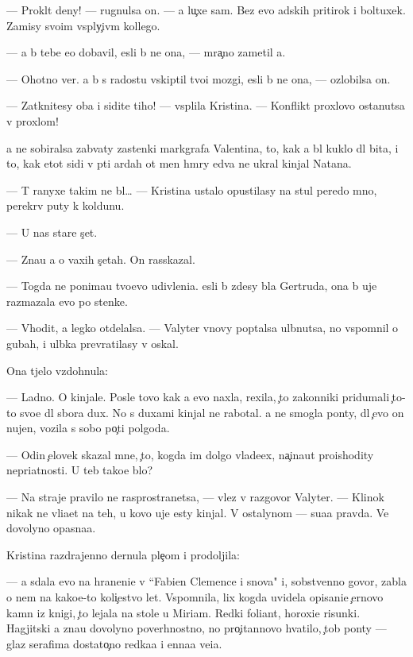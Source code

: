 \documentclass[10pt]{book}
\begin{document}
— Prokl{\ia}t{\yi}{\y} deny! — rugnulsa on. — {\Y}a lu{\c}xe sam. Bez {\y}evo adskih pritirok i boltuxek. Za{\y}misy svo{\y}im vsp{\yi}ly{\c}iv{\yi}m kollego{\y}.

— {\Y}a b{\yi} tebe {\y}e{\x}o dobavil, {\y}esli b{\yi} ne ona, — mra{\c}no zametil {\y}a.

— Ohotno ver{\iu}. {\Y}a b{\yi} s radost{\y}u vskip{\ia}til tvo{\y}i mozgi, {\y}esli b{\yi} ne ona, — ozlobilsa on.

— Zatknitesy oba i sidite tiho! — vsp{\yi}lila Kristina. — Konflikt{\yi} proxlovo ostanutsa v proxlom!

{\Y}a ne sobiralsa zab{\yi}vaty zastenki markgrafa Valentina, to, kak {\y}a b{\yi}l kuklo{\y} dl{\ia} bit{\y}a, i to, kak etot sid{\ia}{\x}i{\y} v p{\ia}ti {\y}ardah ot men{\ia} hm{\yi}ry {\y}edva ne ukral kinjal Natana.

— T{\yi} ranyxe takim ne b{\yi}l… — Kristina ustalo opustilasy na stul peredo mno{\y}, perekr{\yi}v puty k koldunu.

— U nas star{\yi}{\y}e s{\c}et{\yi}.

— Zna{\y}u {\y}a o vaxih s{\c}etah. On rasskazal.

— Togda ne ponima{\y}u tvo{\y}evo udivleni{\y}a. {\Y}esli b{\yi} zdesy b{\yi}la Gertruda, ona b{\yi} uje razmazala {\y}evo po stenke.

— V{\yi}hodit, {\y}a legko otdelalsa. — Valyter vnovy pop{\yi}talsa ul{\yi}bnutsa, no vspomnil o gubah, i ul{\yi}bka prevratilasy v oskal.

Ona t{\ia}jelo vzdohnula:

— Ladno. O kinjale. Posle tovo kak {\y}a {\y}evo naxla, rexila, {\c}to zakonniki pridumali {\c}to-to svo{\y}e dl{\ia} sbora dux. No s duxami kinjal ne rabotal. {\Y}a ne smogla pon{\ia}ty, dl{\ia} {\c}evo on nujen, vozila s sobo{\y} po{\c}ti polgoda.

— Odin {\c}elovek skazal mne, {\c}to, kogda im dolgo vlade{\y}ex, na{\c}ina{\y}ut proishodity nepri{\y}atnosti. U teb{\ia} tako{\y}e b{\yi}lo?

— Na straje{\y} pravilo ne rasprostran{\ia}{\y}etsa, — vlez v razgovor Valyter. — Klinok nikak ne vli{\y}a{\y}et na teh, u kovo uje {\y}esty kinjal{\yi}. V ostalynom — su{\x}a{\y}a pravda. Ve{\x} dovolyno opasna{\y}a.

Kristina razdrajenno dernula ple{\c}om i prodoljila:

— {\Y}a sdala {\y}evo na hraneni{\y}e v ``Fabien Clemence i s{\yi}nov{\y}a" i, sobstvenno govor{\ia}, zab{\yi}la o nem na kako{\y}e-to koli{\c}estvo let. Vspomnila, lix kogda uvidela opisani{\y}e {\c}ernovo kamn{\ia} iz knigi, {\c}to lejala na stole u Miriam. Redki{\y} foliant, horoxi{\y}e risunki. Hagjitski{\y} {\y}a zna{\y}u dovolyno poverhnostno, no pro{\c}itannovo hvatilo, {\c}tob{\yi} pon{\ia}ty — glaz serafima dostato{\c}no redka{\y}a i {\q}enna{\y}a ve{\x}i{\q}a.
\end{document}
